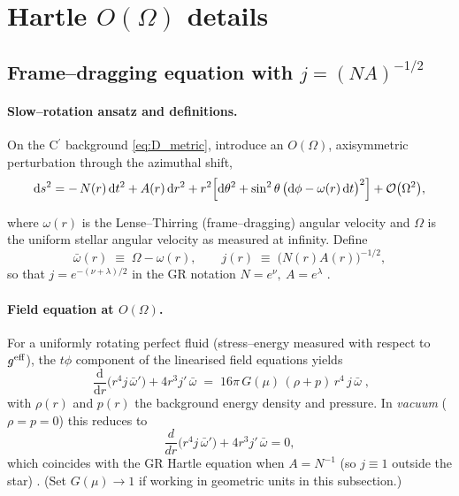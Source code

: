 \documentclass{iopjournal}
\begin{document}
\section{\texorpdfstring{Hartle $O(\Omega)$ details}{Hartle O(Omega) details}}
\label{app:H}

\subsection{\texorpdfstring{Frame–dragging equation with $j=(NA)^{-1/2}$}{Frame–dragging equation with j = (NA) to the −1/2}}\label{app:H1}
\paragraph{Slow–rotation ansatz and definitions.}
On the C$^\prime$ background \eqref{eq:D_metric}, introduce an $O(\Omega)$, axisymmetric perturbation through the azimuthal shift,
\begin{equation}
\mathrm{d}s^{2}
= -\,N(r)\,\mathrm{d}t^{2}
  + A(r)\,\mathrm{d}r^{2}
  + r^{2}\!\left[\mathrm{d}\theta^{2}
  + \sin^{2}\theta\,\big(\mathrm{d}\phi - \omega(r)\,\mathrm{d}t\big)^{2}\right]
  + \order{\Omega^{2}},
\label{eq:H1_metric}
\end{equation}

where $\omega(r)$ is the Lense–Thirring (frame–dragging) angular velocity and $\Omega$ is the uniform stellar angular velocity as measured at infinity. Define
\begin{equation}
\bar\omega(r)\;\equiv\;\Omega-\omega(r),\qquad
j(r)\;\equiv\;\big(N(r)A(r)\big)^{-1/2},
\label{eq:H1_defs}
\end{equation}
so that $j=e^{-(\nu+\lambda)/2}$ in the GR notation $N=e^{\nu},\ A=e^{\lambda}$ \cite{Hartle1967,HartleThorne1968,PoissonWill2014}.

\paragraph{Field equation at $O(\Omega)$.}
For a uniformly rotating perfect fluid (stress–energy measured with respect to $g^{\rm eff}$), the $t\phi$ component of the linearised field equations yields
\begin{equation}
\boxed{\;
\frac{\mathrm{d}}{\mathrm{d}r}\!\Big(r^{4}j\,\bar\omega'\Big)
+4r^{3}j'\,\bar\omega
\;=\;16\pi\,G(\mu)\,(\rho+p)\,r^{4}\,j\,\bar\omega\;,
}
\label{eq:H1_master}
\end{equation}
with $\rho(r)$ and $p(r)$ the background energy density and pressure. In \emph{vacuum} ($\rho=p=0$) this reduces to
\begin{equation}
\frac{d}{dr}\!\Big(r^{4}j\,\bar\omega'\Big)+4r^{3}j'\,\bar\omega=0,
\label{eq:H1_master_vac}
\end{equation}
which coincides with the GR Hartle equation when $A=N^{-1}$ (so $j\equiv1$ outside the star) \cite{Hartle1967,HartleThorne1968}. (Set $G(\mu)\!\to\!1$ if working in geometric units in this subsection.)
\end{document}
